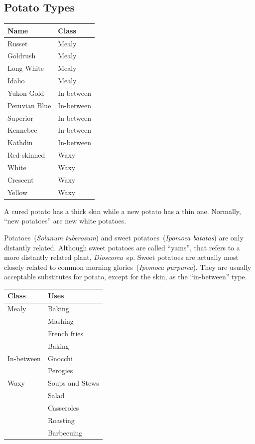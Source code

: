 \subsection{Potato Types}
\begin{tabular}{|ll|}
\hline
Name & Class\\
\hline
Russet & Mealy\\
Goldrush & Mealy\\
Long White & Mealy\\
Idaho & Mealy\\
Yukon Gold & In-between\\
Peruvian Blue & In-between\\
Superior & In-between\\
Kennebec & In-between\\
Kathdin & In-between\\
Red-skinned & Waxy \\
White & Waxy \\
Crescent & Waxy \\
Yellow & Waxy \\
\hline
\end{tabular}

A cured potato has a thick skin while a new potato has a thin one. Normally, ``new potatoes'' are new white potatoes.

Potatoes~(\textit{Solanum tuberosum}) and sweet potatoes~(\textit{Ipomoea batatas}) are only distantly related. Although sweet potatoes are called ``yams'', that refers to a more distantly related plant, \textit{Dioscorea}~sp. Sweet potatoes are actually most closely related to common morning glories~(\textit{Ipomoea purpurea}). They are usually acceptable substitutes for potato, except for the skin, as the ``in-between'' type.

\noindent\begin{tabular}{|ll|}
\hline
Class & Uses\\
\hline
Mealy & Baking\\
      & Mashing\\
      & French fries\\
      & Baking\\
In-between & Gnocchi \\
           & Perogies \\
Waxy  & Soups and Stews \\
      & Salad \\
      & Casseroles \\
      & Roasting \\
      & Barbecuing \\
\hline
\end{tabular}

